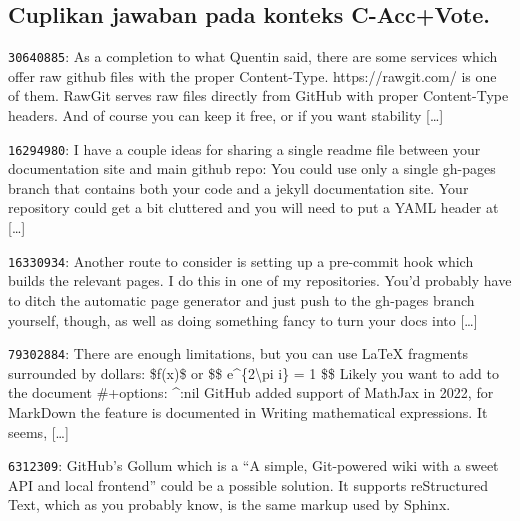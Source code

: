 \subsection{Cuplikan jawaban pada konteks C-Acc+Vote.}
\begin{description}\small
\item[1.] \texttt{30640885}: As a completion to what Quentin said,\allowbreak{} there are some services which offer raw github files with the proper Content-\allowbreak{}Type.\allowbreak{} https:\allowbreak{}/\allowbreak{}/\allowbreak{}rawgit.\allowbreak{}com/\allowbreak{} is one of them.\allowbreak{} RawGit serves raw files directly from GitHub with proper Content-\allowbreak{}Type headers.\allowbreak{} And of course you can keep it free,\allowbreak{} or if you want stability [\ldots]
\item[2.] \texttt{16294980}: I have a couple ideas for sharing a single readme file between your documentation site and main github repo:\allowbreak{} You could use only a single gh-\allowbreak{}pages branch that contains both your code and a jekyll documentation site.\allowbreak{} Your repository could get a bit cluttered and you will need to put a YAML header at [\ldots]
\item[3.] \texttt{16330934}: Another route to consider is setting up a pre-\allowbreak{}commit hook which builds the relevant pages.\allowbreak{} I do this in one of my repositories.\allowbreak{} You'd probably have to ditch the automatic page generator and just push to the gh-\allowbreak{}pages branch yourself,\allowbreak{} though,\allowbreak{} as well as doing something fancy to turn your docs into [\ldots]
\item[4.] \texttt{79302884}: There are enough limitations,\allowbreak{} but you can use LaTeX fragments surrounded by dollars:\allowbreak{} \$f(x)\allowbreak{}\$ or \$\$ e\^{}\{2\textbackslash{}pi i\} =\allowbreak{} 1 \$\$ Likely you want to add to the document \#+options:\allowbreak{} \^{}:\allowbreak{}nil GitHub added support of MathJax in 2022,\allowbreak{} for MarkDown the feature is documented in Writing mathematical expressions.\allowbreak{} It seems,\allowbreak{} [\ldots]
\item[5.] \texttt{6312309}: GitHub's Gollum which is a “A simple,\allowbreak{} Git-\allowbreak{}powered wiki with a sweet API and local frontend” could be a possible solution.\allowbreak{} It supports reStructured Text,\allowbreak{} which as you probably know,\allowbreak{} is the same markup used by Sphinx.\allowbreak{}
\end{description}

